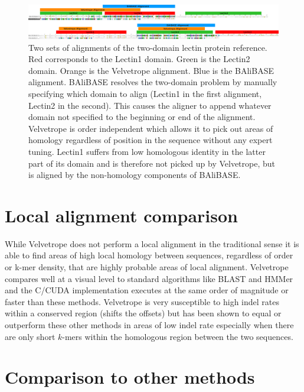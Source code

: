 \documentclass[phd,tocprelim]{cornell}
\begin{document}
 \begin{figure}[htp]%
 \centerline{\includegraphics[width=\textwidth]{figures/velvetrope/Alignments.png}}
 \caption[Multiple sequence alignments]{Two sets of alignments of the two-domain lectin protein reference. Red corresponds to the Lectin1 domain. Green is the Lectin2 domain. Orange is the Velvetrope alignment. Blue is the BAliBASE alignment. BAliBASE resolves the two-domain problem by manually specifying which domain to align (Lectin1 in the first alignment, Lectin2 in the second). This causes the aligner to append whatever domain not specified to the beginning or end of the alignment. Velvetrope is order independent which allows it to pick out areas of homology regardless of position in the sequence without any expert tuning. Lectin1 suffers from low homologous identity in the latter part of its domain and is therefore not picked up by Velvetrope, but is aligned by the non-homology components of BAliBASE.}
 	\label{fig:vr05}
 \end{figure}


\section*{Local alignment comparison}

While Velvetrope does not perform a local alignment in the traditional sense it is able to find areas of high local homology between sequences, regardless of order or k-mer density, that are highly probable areas of local alignment. Velvetrope compares well at a visual level to standard algorithms like BLAST \cite{BLAST} and HMMer \cite{Eddy98} and the C/CUDA implementation executes at the same order of magnitude or faster than these methods. Velvetrope is very susceptible to high indel rates within a conserved region (shifts the offsets) but has been shown to equal or outperform these other methods in areas of low indel rate especially when there are only short $k$-mers within the homologous region between the two sequences.

\section{Comparison to other methods} %
\label{sec:Comparison to other methods}
\end{document}
